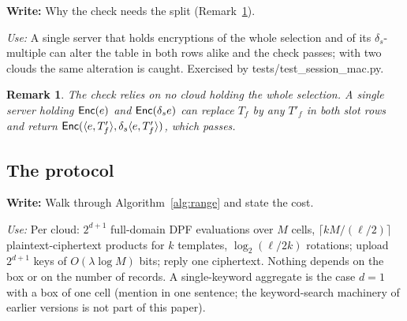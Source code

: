 \documentclass[a4paper,fleqn]{cas-sc}
\newif\ifskeleton \skeletontrue          %
\newcommand{\para}[2]{\ifskeleton\begin{parabox}\textbf{Write:} #1
  \par\smallskip\textit{Use:} #2\end{parabox}\fi}
\newtheorem{remark}{Remark}
\begin{document}
\para{Why the check needs the split (Remark~\ref{rem:single}).}{A single
server that holds encryptions of the whole selection and of its
$\delta_s$-multiple can alter the table in both rows alike and the check
passes; with two clouds the same alteration is caught. Exercised by
tests/test\_session\_mac.py.}

\begin{remark}
\label{rem:single}
The check relies on no cloud holding the whole selection. A single server
holding $\mathsf{Enc}(e)$ and $\mathsf{Enc}(\delta_s e)$ can replace $T_f$ by any $T'_f$ in both
slot rows and return $\mathsf{Enc}(\langle e,T'_f\rangle,\delta_s\langle
e,T'_f\rangle)$, which passes.
\end{remark}

\subsection{The protocol}
\label{sec:protocol}

\para{Walk through Algorithm~\ref{alg:range} and state the cost.}{Per cloud:
$2^{d+1}$ full-domain DPF evaluations over $M$ cells, $\lceil kM/(\ell/2)\rceil$
plaintext-ciphertext products for $k$ templates, $\log_2(\ell/2k)$ rotations;
upload $2^{d+1}$ keys of $O(\lambda\log M)$ bits; reply one ciphertext. Nothing
depends on the box or on the number of records. A single-keyword aggregate is
the case $d=1$ with a box of one cell (mention in one sentence; the
keyword-search machinery of earlier versions is not part of this paper).}
\end{document}
